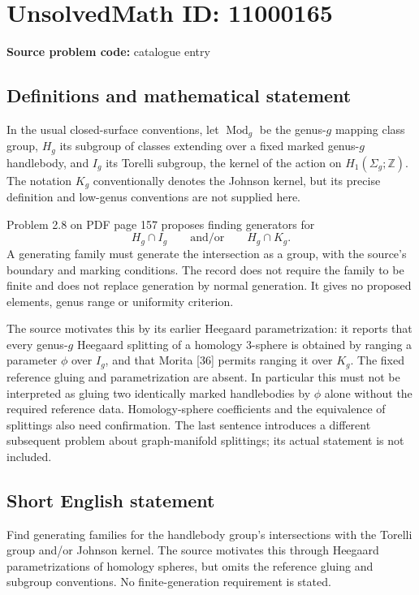 \documentclass[11pt]{article}
\newcommand{\Z}{\mathbb{Z}}
\begin{document}
\section*{UnsolvedMath ID: 11000165}
\textbf{Source problem code:} catalogue entry
\subsection{Definitions and mathematical statement}
In the usual closed-surface conventions, let \(\operatorname{Mod}_g\) be the genus-\(g\) mapping class group, \(H_g\) its subgroup of classes extending over a fixed marked genus-\(g\) handlebody, and \(I_g\) its Torelli subgroup, the kernel of the action on \(H_1(\Sigma_g;\Z)\). The notation \(K_g\) conventionally denotes the Johnson kernel, but its precise definition and low-genus conventions are not supplied here.

Problem 2.8 on PDF page 157 proposes finding generators for
\[
 H_g\cap I_g\qquad\text{and/or}\qquad H_g\cap K_g.
\]
A generating family must generate the intersection as a group, with the source's boundary and marking conditions. The record does not require the family to be finite and does not replace generation by normal generation. It gives no proposed elements, genus range or uniformity criterion.

The source motivates this by its earlier Heegaard parametrization: it reports that every genus-\(g\) Heegaard splitting of a homology \(3\)-sphere is obtained by ranging a parameter \(\phi\) over \(I_g\), and that Morita [36] permits ranging it over \(K_g\). The fixed reference gluing and parametrization are absent. In particular this must not be interpreted as gluing two identically marked handlebodies by \(\phi\) alone without the required reference data. Homology-sphere coefficients and the equivalence of splittings also need confirmation. The last sentence introduces a different subsequent problem about graph-manifold splittings; its actual statement is not included.
\subsection{Short English statement}
Find generating families for the handlebody group's intersections with the Torelli group and/or Johnson kernel. The source motivates this through Heegaard parametrizations of homology spheres, but omits the reference gluing and subgroup conventions. No finite-generation requirement is stated.
\end{document}
